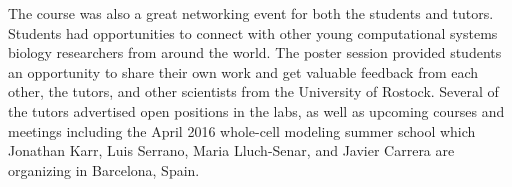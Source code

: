 \documentclass[journal,transmag]{IEEEtran}
\newcommand{\comment}[3]{\pdfmarkupcomment[markup=Highlight,color=yellow,author={#2}]{#1}{#3}}
\begin{document}
The course was also a great networking event for both the students and tutors. 
Students had opportunities to connect with other young computational systems biology researchers from around the world.
The poster session provided students an opportunity to share their own work and get valuable feedback from each other, the tutors, and other scientists from the University of Rostock.
Several of the tutors advertised open positions in the labs, as well as upcoming courses and meetings including the April 2016 whole-cell modeling summer school which Jonathan Karr, Luis Serrano, Maria Lluch-Senar, and Javier Carrera are organizing in Barcelona, Spain.


\end{document}
